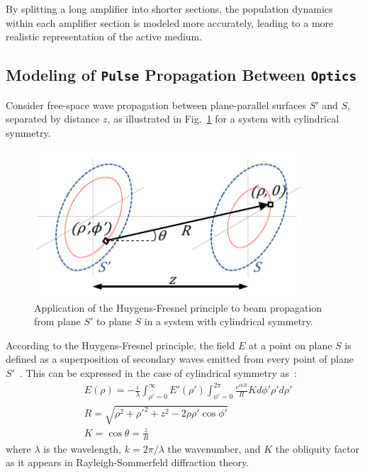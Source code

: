 \documentclass{report}
\begin{document}
By splitting a long amplifier into shorter sections, the population dynamics within each amplifier section is modeled more accurately, leading to a more realistic representation of the active medium.


\subsection{Modeling of \texttt{Pulse} Propagation Between \texttt{Optics}}\label{propagation}

Consider free-space wave propagation between plane-parallel surfaces \(S'\) and \(S\), separated by distance \(z\), as illustrated in Fig.~\ref{fig:diffraction} for a system with cylindrical symmetry.
\begin{figure}[ht] 
 \centering
 \includegraphics[width=10cm]{images/diffraction.pdf}
 \caption{Application of the Huygens-Fresnel principle to beam propagation from plane \(S'\) to plane \(S\) in a system with cylindrical symmetry.}
 \label{fig:diffraction}
\end{figure}
According to the Huygens-Fresnel principle, the field \(E\) at a point on plane \(S\) is defined as a superposition of secondary waves emitted from every point of plane \(S'\)~\cite{BornWolf:1999}. This can be expressed in the case of cylindrical symmetry as~\cite{Siegman:1986,PeatrossWare:2015}:
\begin{subequations} \label{eq:DI}
 \begin{align}
  &E(\rho) = -\frac{i}{\lambda} \int_{\rho'=0}^{\infty} E'(\rho') \int_{\phi'=0}^{2\pi} \frac{e^{ikR}}{R} K d\phi' \rho' d\rho' \label{eq:DI2a}\\
  &R = \sqrt{\rho^2 + \rho'^2 + z^2 - 2\rho\rho'\cos\phi'} \label{eq:DI2b}\\
  &K = \cos\theta = \frac{z}{R} \label{eq:DI2c}
 \end{align}
\end{subequations}
where \(\lambda\) is the wavelength, \(k = 2\pi / \lambda\) the wavenumber, and \(K\) the obliquity factor as it appears in Rayleigh-Sommerfeld diffraction theory.
\end{document}
